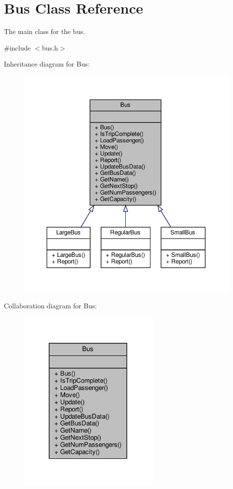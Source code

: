 \hypertarget{classBus}{}\section{Bus Class Reference}
\label{classBus}


The main class for the bus.  




{\ttfamily \#include $<$bus.\+h$>$}



Inheritance diagram for Bus\+:
\nopagebreak
\begin{figure}[H]
\begin{center}
\leavevmode
\includegraphics[width=347pt]{classBus__inherit__graph}
\end{center}
\end{figure}


Collaboration diagram for Bus\+:
\nopagebreak
\begin{figure}[H]
\begin{center}
\leavevmode
\includegraphics[width=200pt]{classBus__coll__graph}
\end{center}
\end{figure}
